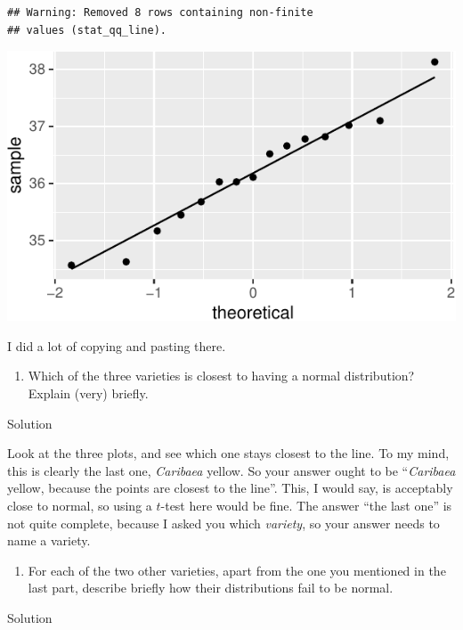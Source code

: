 \documentclass[]{tufte-book}
\providecommand{\tightlist}{%
  \setlength{\itemsep}{0pt}\setlength{\parskip}{0pt}}
\theoremstyle{definition}
\theoremstyle{definition}
\theoremstyle{definition}
\theoremstyle{remark}
\begin{document}
\begin{verbatim}
## Warning: Removed 8 rows containing non-finite
## values (stat_qq_line).
\end{verbatim}

\includegraphics{09-normal-quantile_files/figure-latex/unnamed-chunk-6-1}

I did a lot of copying and pasting there.

\begin{enumerate}
\def\labelenumi{(\alph{enumi})}
\setcounter{enumi}{4}
\tightlist
\item
  Which of the three varieties is closest to having a normal
  distribution? Explain (very) briefly.
\end{enumerate}

Solution

Look at the three plots, and see which one stays closest to the line. To
my mind, this is clearly the last one, \emph{Caribaea} yellow. So your
answer ought to be ``\emph{Caribaea} yellow, because the points are
closest to the line''. This, I would say, is acceptably close to normal,
so using a \(t\)-test here would be fine. The answer ``the last one'' is
not quite complete, because I asked you which \emph{variety}, so your
answer needs to name a variety.

\begin{enumerate}
\def\labelenumi{(\alph{enumi})}
\setcounter{enumi}{5}
\tightlist
\item
  For each of the two other varieties, apart from the one you mentioned
  in the last part, describe briefly how their distributions fail to be
  normal.
\end{enumerate}

Solution
\end{document}
